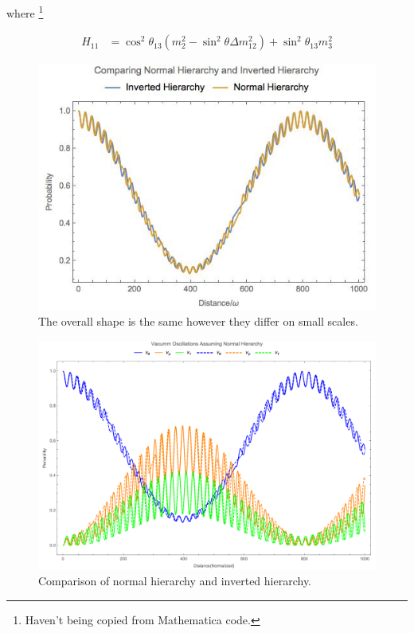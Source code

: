 \documentclass{tufte-handout}
\begin{document}
where \footnote{Haven't being copied from Mathematica code.}

\begin{align*}
H_{11} & = \cos^2\theta_{13}( m_2^2 - \sin^2\theta  \Delta m_{12}^2 ) + \sin^2\theta_{13} m_3^2 
\end{align*}




\begin{figure}
\includegraphics{assets/vacOsc3Flavor}
\caption{The overall shape is the same however they differ on small scales.}
\end{figure}


\begin{figure}
\centering
\includegraphics{assets/vacOscNormInvComp}
\caption{Comparison of normal hierarchy and inverted hierarchy.}
\label{fig:vacOscNormInvComp}
\end{figure}
\end{document}
